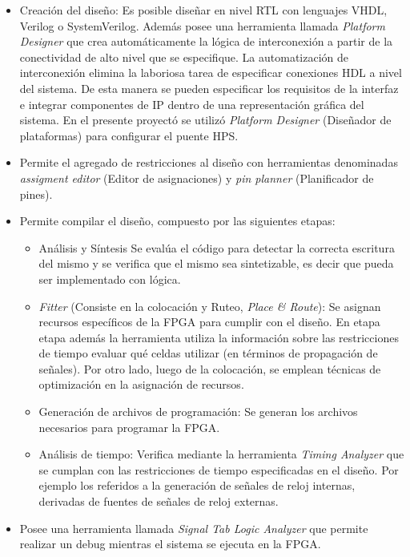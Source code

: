\begin{itemize}
\item
Creación del diseño: Es posible diseñar en nivel RTL con lenguajes VHDL, Verilog o SystemVerilog. Además posee una herramienta llamada \textit{Platform Designer} que crea automáticamente la lógica de interconexión a partir de la conectividad de alto nivel que se especifique. La automatización de interconexión elimina la laboriosa tarea de especificar conexiones HDL a nivel del sistema. De esta manera se pueden  especificar los requisitos de la interfaz e integrar componentes de IP dentro de una representación gráfica del sistema. En el presente proyectó se utilizó \textit{Platform Designer} (Diseñador de plataformas) para configurar el puente HPS.
\item
Permite el agregado de restricciones al diseño con herramientas denominadas \textit{assigment editor} (Editor de asignaciones) y \textit{pin planner} (Planificador de pines).
\item
Permite compilar el diseño, compuesto por las siguientes etapas:
\begin{itemize}
	\item
	Análisis y Síntesis
	Se evalúa el código para detectar la correcta escritura del mismo y se verifica que el mismo sea sintetizable, es decir que pueda ser implementado con lógica.
	\item
	\textit{Fitter} (Consiste en la colocación y Ruteo, \textit{Place \& Route}): Se asignan recursos específicos de la FPGA para cumplir con el diseño. En etapa etapa además la herramienta utiliza la información sobre las restricciones de tiempo evaluar qué celdas utilizar (en términos de propagación de señales). Por otro lado, luego de la colocación, se emplean técnicas de optimización en la asignación de recursos.
	\item
	Generación de archivos de programación: Se generan los archivos necesarios para programar la FPGA.
	\item
	 Análisis de tiempo: Verifica mediante la herramienta \textit{Timing Analyzer} que se cumplan con las restricciones de tiempo especificadas en el diseño. Por ejemplo los referidos a la generación de señales de reloj internas, derivadas de fuentes de señales de reloj externas.
	\end{itemize}
	
\item 
Posee una herramienta llamada \textit{Signal Tab Logic Analyzer} que permite realizar un debug mientras el sistema se ejecuta en la FPGA.

\end{itemize}

